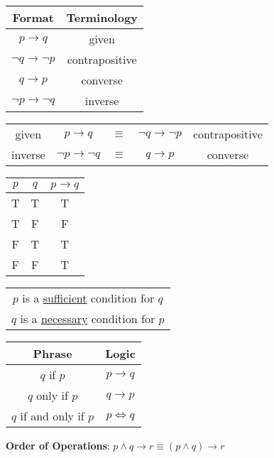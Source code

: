 \begin{center}
  \begin{tabular}{c|c}
    Format                     & Terminology    \\
    \hline
    $p \rightarrow q$             & given          \\
    $\lnot q \rightarrow \lnot p$ & contrapositive \\
    $q \rightarrow p$             & converse       \\
    $\lnot p \rightarrow \lnot q$ & inverse        \\
  \end{tabular}
  \qquad
  \begin{tabular}{ccccc}
    given   & $p \rightarrow q$             & $\equiv$ & $\lnot q \rightarrow \lnot p$ & contrapositive \\
    inverse & $\lnot p \rightarrow \lnot q$ & $\equiv$ & $q \rightarrow p$             & converse
  \end{tabular}
\end{center}

\begin{center}
  \begin{tabular}{c|c|c}
    $p$ & $q$ & $p \rightarrow q$ \\
    \hline
    T   & T   & T              \\
    T   & F   & F              \\
    F   & T   & T              \\
    F   & F   & T              \\
  \end{tabular}
  \quad
  \begin{tabular}{c}
    $p$ is a \underline{sufficient} condition for $q$ \\
    $q$ is a \underline{necessary} condition for $p$
  \end{tabular}
  \quad
  \begin{tabular}{c|c}
    Phrase                 & Logic          \\
    \hline
    $q$ if $p$             & $p \rightarrow q$ \\
    $q$ only if $p$        & $q \rightarrow p$ \\
    $q$ if and only if $p$ & $p \iff q$
  \end{tabular}
\end{center}

\begin{center}
  \textbf{Order of Operations}: $p \land q \rightarrow r \equiv (p \land q) \rightarrow r$
\end{center}


